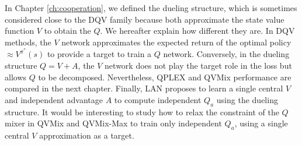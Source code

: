In Chapter \ref{ch:cooperation}, we defined the dueling structure, which is sometimes considered close to the DQV family because both approximate the state value function $V$ to obtain the $Q$.
We hereafter explain how different they are.
In DQV methods, the $V$ network approximates the expected return of the optimal policy $\approx V^{\pi^*}(s)$ to provide a target to train a $Q$ network.
Conversely, in the dueling structure $Q=V+A$, the $V$ network does not play the target role in the loss but allows $Q$ to be decomposed.
Nevertheless, QPLEX and QVMix performance are compared in the next chapter.
Finally, LAN proposes to learn a single central $V$ and independent advantage $A$ to compute independent $Q_a$ using the dueling structure.
It would be interesting to study how to relax the constraint of the $Q$ mixer in QVMix and QVMix-Max to train only independent $Q_a$, using a single central $V$ approximation as a target.


